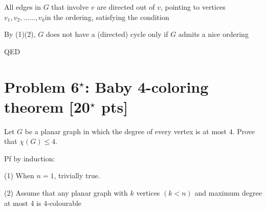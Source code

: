 \documentclass[11pt,twoside]{article}
\newcommand{\problem}[1]{\section*{Problem #1}}
\begin{document}
All edges in $G$ that involve $v$ are directed out of $v$, pointing to vertices $v_1, v_2, ......, v_k$in the ordering, satisfying the condition

By (1)(2), $G$ does not have a (directed) cycle only if $G$ admits a nice ordering 

\hspace*{\fill}

QED




\problem{6$^\star$: Baby 4-coloring theorem [20$^\star$ pts]}



Let $G$ be a planar graph in which the degree of every vertex is at most $4$.
Prove that $\chi(G) \leq 4$.

\hspace*{\fill}

Pf by induction:

(1) When $n = 1$, trivially true.

(2) Assume that any planar graph with $k$ vertices $(k<n)$ and maximum degree at most 4 is 4-colourable

\end{document}
